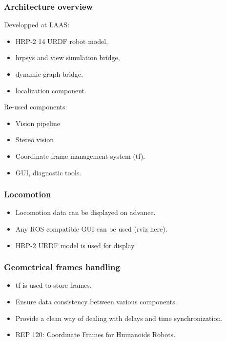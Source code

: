 \documentclass[14pt,utf8,hyperref={pdfpagelabels=false}]{beamer}
\begin{document}

\begin{slideDecision}
  \frametitle{Architecture overview}

  Developped at LAAS:
  \begin{itemize}
  \item HRP-2 14 URDF robot model,
  \item hrpsys and view simulation bridge,
  \item dynamic-graph bridge,
  \item localization component.
  \end{itemize}

  Re-used components:
  \begin{itemize}
    \item Vision pipeline%
    \item Stereo vision%
    \item Coordinate frame management system (tf).
    \item GUI, diagnostic tools.
  \end{itemize}
\end{slideDecision}


\begin{slideDecision}
  \frametitle{Locomotion}

  \begin{itemize}
  \item Locomotion data can be displayed on advance.
  \item Any ROS compatible GUI can be used (rviz here).
  \item HRP-2 URDF model is used for display.
  \end{itemize}
\end{slideDecision}


\begin{slideDecision}
  \frametitle{Geometrical frames handling}

  \begin{itemize}
  \item tf is used to store frames.
  \item Ensure data consistency between various components.
  \item Provide a clean way of dealing with delays and time synchronization.
  \item REP 120: Coordinate Frames for Humanoids Robots.
  \end{itemize}
\end{slideDecision}
\end{document}
